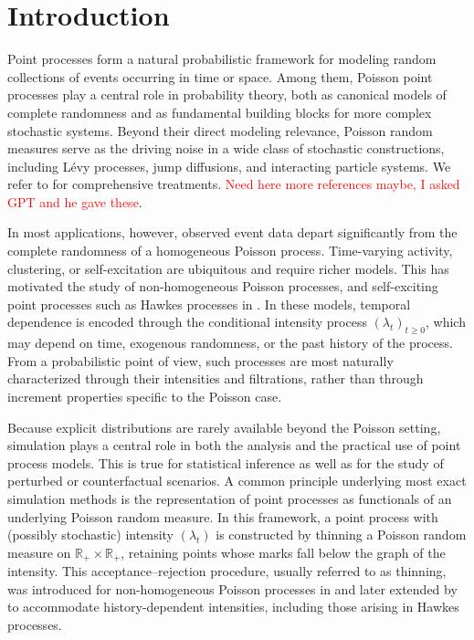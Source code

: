 \documentclass{article} %
\newcommand{\1}{\mathbbm{1}} %
\begin{document}
\maketitle
\begin{abstract}
    Conditional
\end{abstract}

\tableofcontents

\section{Introduction}

Point processes form a natural probabilistic framework for modeling random collections of events occurring in time or space. Among them, Poisson point processes play a central role in probability theory, both as canonical models of complete randomness and as fundamental building blocks for more complex stochastic systems. Beyond their direct modeling relevance, Poisson random measures serve as the driving noise in a wide class of stochastic constructions, including Lévy processes, jump diffusions, and interacting particle systems. We refer to \citet{kingman1992poisson, daley2003introduction, last2017lectures} for comprehensive treatments. \textcolor{red}{Need here more references maybe, I asked GPT and he gave these}.

In most applications, however, observed event data depart significantly from the complete randomness of a homogeneous Poisson process. Time-varying activity, clustering, or self-excitation are ubiquitous and require richer models. This has motivated the study of non-homogeneous Poisson processes, and self-exciting point processes such as Hawkes processes in \citet{hawkes1971spectra}. In these models, temporal dependence is encoded through the conditional intensity process $(\lambda_t)_{t \geq 0}$, which may depend on time, exogenous randomness, or the past history of the process. From a probabilistic point of view, such processes are most naturally characterized through their intensities and filtrations, rather than through increment properties specific to the Poisson case.

Because explicit distributions are rarely available beyond the Poisson setting, simulation plays a central role in both the analysis and the practical use of point process models. This is true for statistical inference as well as for the study of perturbed or counterfactual scenarios. A common principle underlying most exact simulation methods is the representation of point processes as functionals of an underlying Poisson random measure. In this framework, a point process with (possibly stochastic) intensity $(\lambda_t)$ is constructed by thinning a Poisson random measure on $\mathbb{R}_+ \times \mathbb{R}_+$, retaining points whose marks fall below the graph of the intensity. This acceptance--rejection procedure, usually referred to as thinning, was introduced for non-homogeneous Poisson processes in \citet{lewis1979simulation} and later extended by \citet{ogata1981lewis, ogata1998space} to accommodate history-dependent intensities, including those arising in Hawkes processes.
\end{document}
